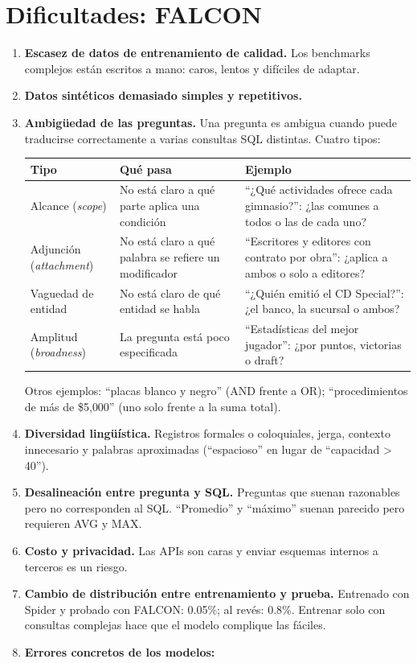 \documentclass[11pt,a4paper]{article}
\begin{document}
\section{Dificultades: FALCON}
\begin{enumerate}
  \item \textbf{Escasez de datos de entrenamiento de calidad.} Los benchmarks complejos están escritos a mano: caros, lentos y difíciles de adaptar.
  \item \textbf{Datos sintéticos demasiado simples y repetitivos.}
  \item \textbf{Ambigüedad de las preguntas.} Una pregunta es ambigua cuando puede traducirse correctamente a varias consultas SQL distintas. Cuatro tipos:

  \begin{center}
  \small
  \begin{tabularx}{\linewidth}{@{}l X X@{}}
    \toprule
    \textbf{Tipo} & \textbf{Qué pasa} & \textbf{Ejemplo} \\
    \midrule
    Alcance (\textit{scope}) & No está claro a qué parte aplica una condición & ``¿Qué actividades ofrece cada gimnasio?'': ¿las comunes a todos o las de cada uno? \\
    Adjunción (\textit{attachment}) & No está claro a qué palabra se refiere un modificador & ``Escritores y editores con contrato por obra'': ¿aplica a ambos o solo a editores? \\
    Vaguedad de entidad & No está claro de qué entidad se habla & ``¿Quién emitió el CD Special?'': ¿el banco, la sucursal o ambos? \\
    Amplitud (\textit{broadness}) & La pregunta está poco especificada & ``Estadísticas del mejor jugador'': ¿por puntos, victorias o draft? \\
    \bottomrule
  \end{tabularx}
  \end{center}

  Otros ejemplos: ``placas blanco y negro'' (AND frente a OR); ``procedimientos de más de \$5{,}000'' (uno solo frente a la suma total).
  \item \textbf{Diversidad lingüística.} Registros formales o coloquiales, jerga, contexto innecesario y palabras aproximadas (``espacioso'' en lugar de ``capacidad > 40'').
  \item \textbf{Desalineación entre pregunta y SQL.} Preguntas que suenan razonables pero no corresponden al SQL. ``Promedio'' y ``máximo'' suenan parecido pero requieren AVG y MAX.
  \item \textbf{Costo y privacidad.} Las APIs son caras y enviar esquemas internos a terceros es un riesgo.
  \item \textbf{Cambio de distribución entre entrenamiento y prueba.} Entrenado con Spider y probado con FALCON: 0.05\%; al revés: 0.8\%. Entrenar solo con consultas complejas hace que el modelo complique las fáciles.
  \item \textbf{Errores concretos de los modelos:}


\end{enumerate}
\end{document}

